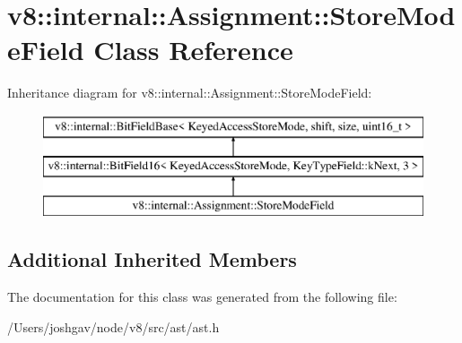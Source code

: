 \hypertarget{classv8_1_1internal_1_1_assignment_1_1_store_mode_field}{}\section{v8\+:\+:internal\+:\+:Assignment\+:\+:Store\+Mode\+Field Class Reference}
\label{classv8_1_1internal_1_1_assignment_1_1_store_mode_field}
Inheritance diagram for v8\+:\+:internal\+:\+:Assignment\+:\+:Store\+Mode\+Field\+:\begin{figure}[H]
\begin{center}
\leavevmode
\includegraphics[height=3.000000cm]{classv8_1_1internal_1_1_assignment_1_1_store_mode_field}
\end{center}
\end{figure}
\subsection*{Additional Inherited Members}


The documentation for this class was generated from the following file\+:\begin{DoxyCompactItemize}
\item 
/\+Users/joshgav/node/v8/src/ast/ast.\+h\end{DoxyCompactItemize}
